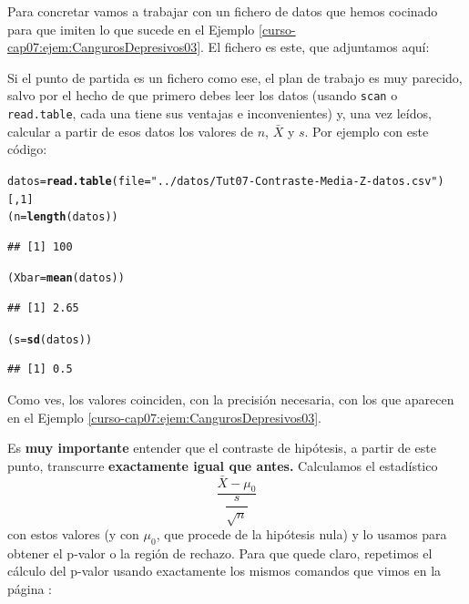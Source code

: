 \documentclass[10pt,a4paper]{article}\usepackage[]{graphicx}\usepackage[]{color}
\makeatletter
\newcommand{\hlnum}[1]{\textcolor[rgb]{0.686,0.059,0.569}{#1}}%
\newcommand{\hlstr}[1]{\textcolor[rgb]{0.192,0.494,0.8}{#1}}%
\newcommand{\hlstd}[1]{\textcolor[rgb]{0.345,0.345,0.345}{#1}}%
\newcommand{\hlkwb}[1]{\textcolor[rgb]{0.69,0.353,0.396}{#1}}%
\newcommand{\hlkwc}[1]{\textcolor[rgb]{0.333,0.667,0.333}{#1}}%
\newcommand{\hlkwd}[1]{\textcolor[rgb]{0.737,0.353,0.396}{\textbf{#1}}}%
\newenvironment{kframe}{%
 \def\at@end@of@kframe{}%
 \ifinner\ifhmode%
  \def\at@end@of@kframe{\end{minipage}}%
  \begin{minipage}{\columnwidth}%
 \fi\fi%
 \def\FrameCommand##1{\hskip\@totalleftmargin \hskip-\fboxsep
 \colorbox{shadecolor}{##1}\hskip-\fboxsep
     \hskip-\linewidth \hskip-\@totalleftmargin \hskip\columnwidth}%
 \MakeFramed {\advance\hsize-\width
   \@totalleftmargin\z@ \linewidth\hsize
   \@setminipage}}%
 {\par\unskip\endMakeFramed%
 \at@end@of@kframe}
\newenvironment{knitrout}{}{} %
\newcounter {cont01}
\makeatother
\begin{document}
Para concretar vamos a trabajar con un fichero de datos que hemos cocinado para que imiten lo que sucede en el Ejemplo \ref{curso-cap07:ejem:CangurosDepresivos03}. El fichero es este, que adjuntamos aquí:
\begin{center}
\end{center}

Si el punto de partida es un fichero como ese, el plan de trabajo es muy parecido, salvo por el hecho de que primero debes leer los datos (usando {\tt scan} o {\tt read.table}, cada una tiene sus ventajas e inconvenientes) y, una vez leídos, calcular a partir de esos datos los valores de $n$, $\bar X$  y $s$. Por ejemplo con este código:

\begin{knitrout}
\color{fgcolor}\begin{kframe}
\begin{alltt}
\hlstd{datos} \hlkwb{=} \hlkwd{read.table}\hlstd{(}\hlkwc{file} \hlstd{=} \hlstr{"../datos/Tut07-Contraste-Media-Z-datos.csv"}\hlstd{)[ ,}\hlnum{1}\hlstd{]}
\hlstd{(n} \hlkwb{=} \hlkwd{length}\hlstd{(datos))}
\end{alltt}
\begin{verbatim}
## [1] 100
\end{verbatim}
\begin{alltt}
\hlstd{(Xbar} \hlkwb{=} \hlkwd{mean}\hlstd{(datos))}
\end{alltt}
\begin{verbatim}
## [1] 2.65
\end{verbatim}
\begin{alltt}
\hlstd{(s} \hlkwb{=} \hlkwd{sd}\hlstd{(datos))}
\end{alltt}
\begin{verbatim}
## [1] 0.5
\end{verbatim}
\end{kframe}
\end{knitrout}
Como ves, los valores coinciden, con la precisión necesaria, con los que aparecen en el Ejemplo \ref{curso-cap07:ejem:CangurosDepresivos03}.

Es {\bf muy importante} entender que el contraste de hipótesis, a partir de este punto, transcurre {\bf exactamente igual que antes.} Calculamos el estadístico
\[\dfrac{\bar X - \mu_0}{\dfrac{s}{\sqrt{n}}}\]
con estos valores (y con $\mu_0$, que procede de la hipótesis nula) y lo usamos para obtener el p-valor o la región de rechazo. Para que quede claro, repetimos el cálculo del p-valor usando exactamente los mismos comandos que vimos en la página \pageref{tut07:subsubsec:CalculoPValorEjemploCanguros}:
\end{document}
